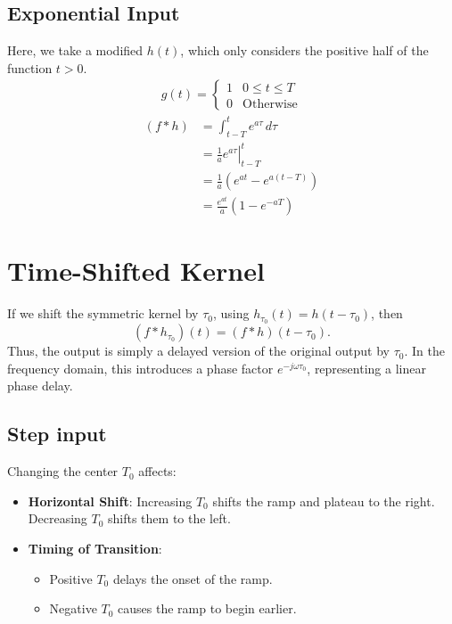 \documentclass[12pt,a4paper]{report}
\newcommand{\brak}[1]{\ensuremath{\left(#1\right)}}
\providecommand{\brak}[1]{\ensuremath{\left(#1\right)}}
\begin{document}
\section{Exponential Input}
Here, we take a modified $h\brak{t}$, which only considers the positive half of the function $t>0$.
\begin{align*}
    g\brak{t} = \begin{cases}
        1 & 0 \le t \le T\\
        0 & \text{Otherwise}
    \end{cases}
\end{align*}
\begin{align*}
\brak{f \ast h} &= \int_{t - T}^{t} e^{a\tau} \, d\tau \\
&= \left. \frac{1}{a} e^{a\tau} \right|_{t - T}^{t} \\
&= \frac{1}{a} \left( e^{at} - e^{a(t - T)} \right) \\
&= \frac{e^{at}}{a} \left(1 - e^{-aT}\right)
\end{align*}
\chapter{Time-Shifted Kernel}

If we shift the symmetric kernel by $\tau_0$, using $h_{\tau_0}(t) = h(t-\tau_0)$, then
\[
(f * h_{\tau_0})(t) = (f * h)(t - \tau_0).
\]
Thus, the output is simply a delayed version of the original output by $\tau_0$. In the frequency domain, this introduces a phase factor $e^{-j\omega \tau_0}$, representing a linear phase delay.

\section{Step input}

Changing the center $T_0$ affects:

\begin{itemize}
    \item \textbf{Horizontal Shift}: Increasing $T_0$ shifts the ramp and plateau to the right. Decreasing $T_0$ shifts them to the left.
    \item \textbf{Timing of Transition}: 
    \begin{itemize}
        \item Positive $T_0$ delays the onset of the ramp.
        \item Negative $T_0$ causes the ramp to begin earlier.
    \end{itemize}
\end{itemize}
\end{document}
